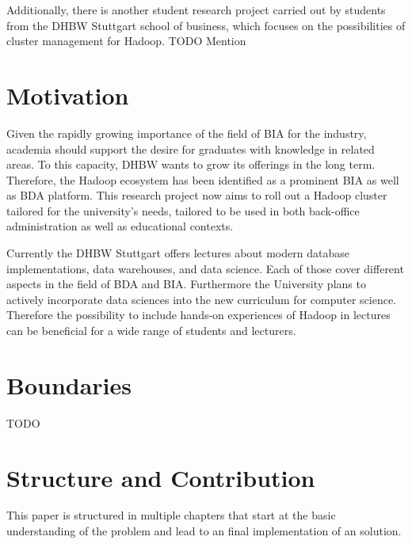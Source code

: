 Additionally, there is another student research project carried out by students from the \ac{DHBW} Stuttgart school of business, which focuses on the possibilities of cluster management for Hadoop.  
TODO Mention \autocite{wi2018managementsystems}



\section{Motivation}
\label{sec:intro:motivation}

Given the rapidly growing importance of the field of \ac{BIA} for the industry, academia
should support the desire for graduates with knowledge in related areas. To this capacity,
\ac{DHBW} wants to grow its offerings in the long term. Therefore, the Hadoop ecosystem has
been identified as a prominent \ac{BIA} as well as \ac{BDA} platform. This research project now
aims to roll out a Hadoop cluster tailored for the university’s needs, tailored to be used in
both back-office administration as well as educational contexts.

Currently the \ac{DHBW} Stuttgart offers lectures about modern database implementations, 
data warehouses, and data science. Each of those cover different aspects in the field of \ac{BDA} and \ac{BIA}. Furthermore the University plans to actively incorporate data sciences into the new curriculum for computer science.
Therefore the possibility to include hands-on experiences of Hadoop in lectures can be beneficial for a wide range of students and lecturers.

\section{Boundaries}
\label{sec:intro:boundaries}

TODO

\section{Structure and Contribution}
\label{sec:intro:structure}

This paper is structured in multiple chapters that start at the basic understanding of the problem 
and lead to an final implementation of an solution.

